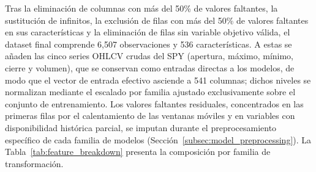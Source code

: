 ﻿\documentclass[11pt,a4paper]{article}
\begin{document}
Tras la eliminaci\'on de columnas con m\'as del 50\% de valores faltantes, la sustituci\'on de infinitos, la exclusi\'on de filas con m\'as del 50\% de valores faltantes en sus caracter\'isticas y la eliminaci\'on de filas sin variable objetivo v\'alida, el dataset final comprende 6{,}507 observaciones y 536 caracter\'isticas. A estas se a\~naden las cinco series OHLCV crudas del SPY (apertura, m\'aximo, m\'inimo, cierre y volumen), que se conservan como entradas directas a los modelos, de modo que el vector de entrada efectivo asciende a 541 columnas; dichos niveles se normalizan mediante el escalado por familia ajustado exclusivamente sobre el conjunto de entrenamiento. Los valores faltantes residuales, concentrados en las primeras filas por el calentamiento de las ventanas m\'oviles y en variables con disponibilidad hist\'orica parcial, se imputan durante el preprocesamiento espec\'ifico de cada familia de modelos (Secci\'on~\ref{subsec:model_preprocessing}). La Tabla~\ref{tab:feature_breakdown} presenta la composici\'on por familia de transformaci\'on.
\end{document}
